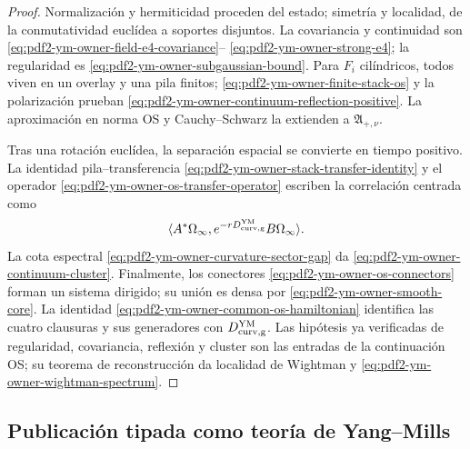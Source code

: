 \begin{proof}
Normalización y hermiticidad proceden del estado; simetría y localidad, de la
conmutatividad euclídea a soportes disjuntos. La covariancia y continuidad son
\eqref{eq:pdf2-ym-owner-field-e4-covariance}--
\eqref{eq:pdf2-ym-owner-strong-e4}; la regularidad es
\eqref{eq:pdf2-ym-owner-subgaussian-bound}. Para
$F_i$ cilíndricos, todos viven en un overlay y una pila finitos;
\eqref{eq:pdf2-ym-owner-finite-stack-os} y la polarización prueban
\eqref{eq:pdf2-ym-owner-continuum-reflection-positive}. La aproximación en norma OS
y Cauchy--Schwarz la extienden a $\mathfrak A_{+,\nu}$.

Tras una rotación euclídea, la separación espacial se convierte en tiempo positivo.
La identidad pila--transferencia
\eqref{eq:pdf2-ym-owner-stack-transfer-identity} y el operador
\eqref{eq:pdf2-ym-owner-os-transfer-operator} escriben la correlación centrada como
\[
 \langle A^*\Omega_\infty,
 e^{-rD_{\rm curv,g}^{\rm YM}}B\Omega_\infty\rangle.
\]
La cota espectral \eqref{eq:pdf2-ym-owner-curvature-sector-gap} da
\eqref{eq:pdf2-ym-owner-continuum-cluster}. Finalmente, los conectores
\eqref{eq:pdf2-ym-owner-os-connectors} forman un sistema dirigido; su unión es densa
por \eqref{eq:pdf2-ym-owner-smooth-core}. La identidad
\eqref{eq:pdf2-ym-owner-common-os-hamiltonian} identifica las cuatro clausuras y sus
generadores con $D_{\rm curv,g}^{\rm YM}$. Las hipótesis ya verificadas de regularidad,
covariancia, reflexión y cluster son las entradas de la continuación OS; su teorema de
reconstrucción da localidad de Wightman y
\eqref{eq:pdf2-ym-owner-wightman-spectrum}.
\end{proof}

\subsection{Publicación tipada como teoría de Yang--Mills}

